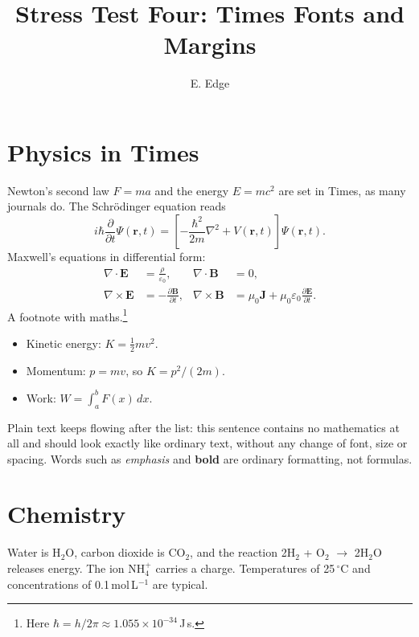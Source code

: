 \documentclass[12pt]{article}
\title{Stress Test Four: Times Fonts and Margins}
\author{E. Edge}
\date{}
\begin{document}
\maketitle
\section{Physics in Times}
Newton's second law $F = ma$ and the energy $E = mc^2$ are set in Times, as many journals do.
The Schr\"odinger equation reads
\begin{equation}
 i\hbar\frac{\partial}{\partial t}\Psi(\mathbf{r},t) = \left[-\frac{\hbar^2}{2m}\nabla^2 + V(\mathbf{r},t)\right]\Psi(\mathbf{r},t).
\end{equation}
Maxwell's equations in differential form:
\begin{align}
 \nabla\cdot\mathbf{E} &= \frac{\rho}{\varepsilon_0}, & \nabla\cdot\mathbf{B} &= 0,\\
 \nabla\times\mathbf{E} &= -\frac{\partial\mathbf{B}}{\partial t}, & \nabla\times\mathbf{B} &= \mu_0\mathbf{J} + \mu_0\varepsilon_0\frac{\partial\mathbf{E}}{\partial t}.
\end{align}
A footnote with maths.\footnote{Here $\hbar = h/2\pi \approx 1.055\times10^{-34}$\,J\,s.}
\begin{itemize}
\item Kinetic energy: $K = \tfrac12 m v^2$.
\item Momentum: $p = mv$, so $K = p^2/(2m)$.
\item Work: $W = \int_a^b F(x)\,dx$.
\end{itemize}
Plain text keeps flowing after the list: this sentence contains no mathematics at all and should look exactly
like ordinary text, without any change of font, size or spacing. Words such as \emph{emphasis} and
\textbf{bold} are ordinary formatting, not formulas.
\section{Chemistry}
Water is H$_2$O, carbon dioxide is CO$_2$, and the reaction 2H$_2$ + O$_2$ $\rightarrow$ 2H$_2$O releases energy.
The ion NH$_4^+$ carries a charge. Temperatures of 25\,$^\circ$C and concentrations of 0.1\,mol\,L$^{-1}$ are typical.
\end{document}
